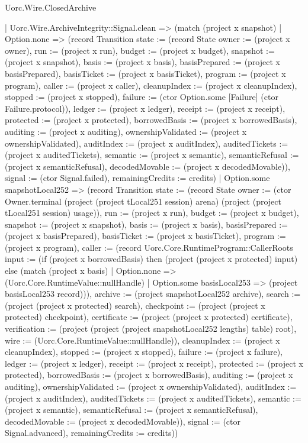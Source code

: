 \begin{lexlean}{Uorc.Wire.ClosedArchive}
\begin{semanticmodule}
{      | Uorc.Wire.ArchiveIntegrity::Signal.clean => (match (project x snapshot)
        | Option.none => (record Transition {state := (record State {owner := (project x owner), run := (project x run), budget := (project x budget), snapshot := (project x snapshot), basis := (project x basis), basisPrepared := (project x basisPrepared), basisTicket := (project x basisTicket), program := (project x program), caller := (project x caller), cleanupIndex := (project x cleanupIndex), stopped := (project x stopped), failure := (ctor Option.some [Failure] (ctor Failure.protocol)), ledger := (project x ledger), receipt := (project x receipt), protected := (project x protected), borrowedBasis := (project x borrowedBasis), auditing := (project x auditing), ownershipValidated := (project x ownershipValidated), auditIndex := (project x auditIndex), auditedTickets := (project x auditedTickets), semantic := (project x semantic), semanticRefusal := (project x semanticRefusal), decodedMovable := (project x decodedMovable)}), signal := (ctor Signal.failed), remainingCredits := credits})
        | Option.some snapshotLocal252 => (record Transition {state := (record State {owner := (ctor Owner.terminal (project (project tLocal251 session) arena) (project (project tLocal251 session) usage)), run := (project x run), budget := (project x budget), snapshot := (project x snapshot), basis := (project x basis), basisPrepared := (project x basisPrepared), basisTicket := (project x basisTicket), program := (project x program), caller := (record Uorc.Core.RuntimeProgram::CallerRoots {input := (if (project x borrowedBasis) then (project (project x protected) input) else (match (project x basis)
          | Option.none => (Uorc.Core.RuntimeValue::nullHandle)
          | Option.some basisLocal253 => (project basisLocal253 record))), archive := (project snapshotLocal252 archive), search := (project (project x protected) search), checkpoint := (project (project x protected) checkpoint), certificate := (project (project x protected) certificate), verification := (project (project (project snapshotLocal252 lengths) table) root), wire := (Uorc.Core.RuntimeValue::nullHandle)}), cleanupIndex := (project x cleanupIndex), stopped := (project x stopped), failure := (project x failure), ledger := (project x ledger), receipt := (project x receipt), protected := (project x protected), borrowedBasis := (project x borrowedBasis), auditing := (project x auditing), ownershipValidated := (project x ownershipValidated), auditIndex := (project x auditIndex), auditedTickets := (project x auditedTickets), semantic := (project x semantic), semanticRefusal := (project x semanticRefusal), decodedMovable := (project x decodedMovable)}), signal := (ctor Signal.advanced), remainingCredits := credits}))
}
\end{semanticmodule}
\end{lexlean}
